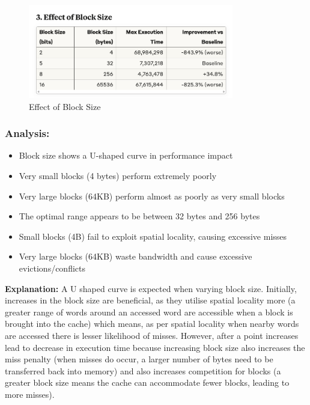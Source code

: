 \documentclass[12pt,a4paper]{article}
\begin{document}
\begin{figure}[H]
    \centering
    \includegraphics[width=0.8\textwidth]{image6_s3.png}
    \caption{Effect of Block Size}
    \label{fig:block-size-effect}
\end{figure}

\subsubsection*{Analysis:}
\begin{itemize}
    \item Block size shows a U-shaped curve in performance impact
    \item Very small blocks (4 bytes) perform extremely poorly
    \item Very large blocks (64KB) perform almost as poorly as very small blocks
    \item The optimal range appears to be between 32 bytes and 256 bytes
    \item Small blocks (4B) fail to exploit spatial locality, causing excessive misses
    \item Very large blocks (64KB) waste bandwidth and cause excessive evictions/conflicts
\end{itemize}

\textbf{Explanation:} A U shaped curve is expected when varying block size. Initially, increases in the block size are beneficial, as they utilise spatial locality more (a greater range of words around an accessed word are accessible when a block is brought into the cache) which means, as per spatial locality when nearby words are accessed there is lesser likelihood of misses. However, after a point increases lead to decrease in execution time because increasing block size also increases the miss penalty (when misses do occur, a larger number of bytes need to be transferred back into memory) and also increases competition for blocks (a greater block size means the cache can accommodate fewer blocks, leading to more misses).
\end{document}
